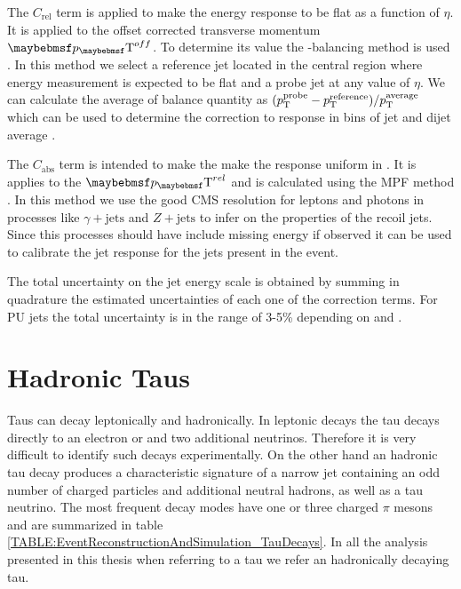 The $C_{\text{rel}}$ term is applied to make the energy response to be flat as a function of $\eta$. It is applied to the offset corrected transverse momentum $\pT^{off}$. To determine its value the \pt-balancing method is used \cite{ARTICLE:CMSDeterminationJetEnergyCalibration}. In this method we select a reference jet located in the central region where energy measurement is expected to be flat and a probe jet at any value of $\eta$. We can calculate the average of balance quantity as $(p_{\mathrm{T}}^{\text{probe}} - p_{\mathrm{T}}^{\text{reference}} ) / p_{\mathrm{T}}^{\text{average}}$ which can be used to determine the correction to response in bins of jet \eta and dijet average \pt. 

The $C_{\text{abs}}$ term is intended to make the make the response uniform in \pt. It is applies to the $\pT^{rel}$ and is calculated using the \gls{MPF} method \cite{ARTICLE:CDFDijetAngularDistribution}. In this method we use the good \gls{CMS} resolution for leptons and photons in processes like $\gamma + \text{jets}$ and $Z + \text{jets}$ to infer on the properties of the recoil jets. Since this processes should have include missing energy if observed it can be used to calibrate the jet response for the jets present in the event.

The total uncertainty on the jet energy scale is obtained by summing in quadrature the estimated uncertainties of each one of the correction terms. For \gls{PU} jets the total uncertainty is in the range of 3-5\% depending on \pt and \eta \cite{ARTICLE:CMSDeterminationJetEnergyCalibration}.


\section{Hadronic Taus}
\label{SECTION:EventReconstructionAndSimulation_Taus}


Taus can decay leptonically and hadronically. In leptonic decays the tau decays directly to an electron or and two additional neutrinos. Therefore it is very difficult to identify such decays experimentally. On the other hand an hadronic tau decay produces a characteristic signature of a narrow jet containing an odd number of charged particles and additional neutral hadrons, as well as a tau neutrino. The most frequent decay modes have one or three charged $\pi$ mesons and are summarized in table \ref{TABLE:EventReconstructionAndSimulation_TauDecays}. In all the analysis presented in this thesis when referring to a tau we refer an hadronically decaying tau.

